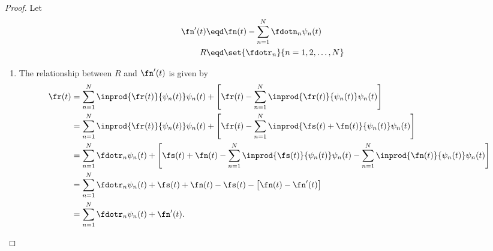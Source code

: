 \begin{proof}
Let
\begin{align*}
  \fn'(t) &\eqd \fn(t) - \sum_{n=1}^N \fdotn_n \psi_n(t) \\
  R       &\eqd \set{\fdotr_n}{n=1,2,\ldots,N}
\end{align*}

\begin{enumerate}
\item The relationship between $R$ and $\fn'(t)$ is given by
\begin{align*}
   \fr(t)
     &= \sum_{n=1}^N \inprod{\fr(t)}{\psi_n(t)}\psi_n(t) + 
        \left[\fr(t)- \sum_{n=1}^N \inprod{\fr(t)}{\psi_n(t)}\psi_n(t) \right]
   \\&= \sum_{n=1}^N \inprod{\fr(t)}{\psi_n(t)}\psi_n(t) + 
        \left[\fr(t)- \sum_{n=1}^N \inprod{\fs(t)+\fn(t)}{\psi_n(t)}\psi_n(t) \right]
   \\&= \sum_{n=1}^N \fdotr_n\psi_n(t) + 
        \left[\fs(t)+\fn(t) - \sum_{n=1}^N \inprod{\fs(t)}{\psi_n(t)}\psi_n(t)
                        - \sum_{n=1}^N \inprod{\fn(t)}{\psi_n(t)}\psi_n(t) \right]
   \\&= \sum_{n=1}^N \fdotr_n\psi_n(t) + 
        \fs(t)+\fn(t) - \fs(t) - \left[ \fn(t) - \fn'(t)\right]
   \\&= \sum_{n=1}^N \fdotr_n\psi_n(t) + \fn'(t).
\end{align*}


\end{enumerate}
\end{proof}
